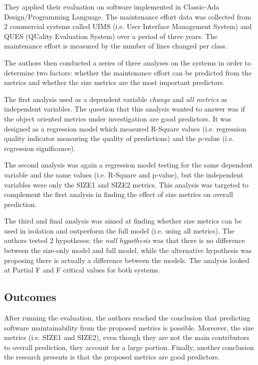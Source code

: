 \documentclass[a4paper,12pt]{article}
\begin{document}
They applied their evaluation on software implemented in Classic-Ada 
Design/Programming Language. The maintenance effort data was collected from
2 commercial systems called UIMS (i.e. User Interface Management System)
and QUES (QUality Evaluation System) over a period of three years. The 
maintenance effort is measured by the number of lines changed per class.

The authors then conducted a series of three analyses on the systems in order
to determine two factors: whether the maintenance effort can be predicted from the
metrics and whether the size metrics are the most important predictors.

The first analysis used as a dependent variable \emph{change} and \emph{all metrics}
as independent variables. The question that this analysis wanted to answer was if 
the object oriented metrics under investigation are good predictors. It was designed
as a regression model which measured R-Square values (i.e. regression quality
indicator measuring the quality of predictions) and the p-value (i.e. regression
significance).

The second analysis was again a regression model testing for the same dependent 
variable and the same values (i.e. R-Square and p-value), but the independent 
variables were only the SIZE1 and SIZE2 metrics. This analysis was targeted to 
complement the first analysis in finding the effect of size metrics on overall 
prediction.

The third and final analysis was aimed at finding whether size metrics can be used
in isolation and outperform the full model (i.e. using all metrics). The authors
tested 2 hypotheses: the \emph{null hypothesis} was that there is no difference 
between the size-only model and full model, while the alternative hypothesis was
proposing there is actually a difference between the models. The analysis looked at
Partial F and F critical values for both systems.

\subsection{Outcomes}

After running the evaluation, the authors reached the conclusion that predicting
software maintainability from the proposed metrics is possible. Moreover, the size
metrics (i.e. SIZE1 and SIZE2), even though they are not the main contributors to
overall prediction, they account for a large portion. Finally, another conclusion
the research presents is that the proposed metrics are good predictors.
\end{document}
